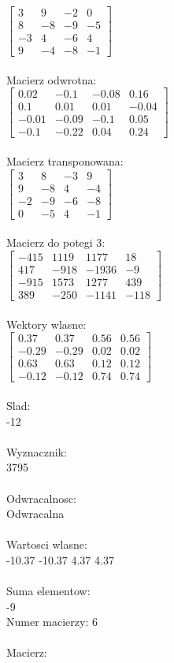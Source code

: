 \documentclass[a4paper,12pt]{article}
\begin{document}
$\begin{bmatrix} 3&9&-2&0\\8&-8&-9&-5\\-3&4&-6&4\\9&-4&-8&-1 \end{bmatrix}$
\\
\\
Macierz odwrotna:\\

$\begin{bmatrix} 0.02&-0.1&-0.08&0.16\\0.1&0.01&0.01&-0.04\\-0.01&-0.09&-0.1&0.05\\-0.1&-0.22&0.04&0.24 \end{bmatrix}$
\\
\\
Macierz transponowana:\\

$\begin{bmatrix} 3&8&-3&9\\9&-8&4&-4\\-2&-9&-6&-8\\0&-5&4&-1 \end{bmatrix}$
\\
\\
Macierz do potegi 3:\\

$\begin{bmatrix} -415&1119&1177&18\\417&-918&-1936&-9\\-915&1573&1277&439\\389&-250&-1141&-118 \end{bmatrix}$
\\
\\
Wektory wlasne:\\

$\begin{bmatrix} 0.37&0.37&0.56&0.56\\-0.29&-0.29&0.02&0.02\\0.63&0.63&0.12&0.12\\-0.12&-0.12&0.74&0.74 \end{bmatrix}$
\\
\\
Slad:\\
-12
\\
\\
Wyznacznik:\\
3795
\\
\\
Odwracalnosc:\\
Odwracalna
\\
\\
Wartosci wlasne:\\
-10.37 -10.37 4.37 4.37
\\
\\
Suma elementow:\\
-9
\\
\newpage
Numer macierzy:
6
\\
\\
Macierz:\\
\end{document}

